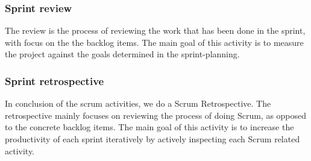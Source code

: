 \subsubsection{Sprint review}
The review is the process of reviewing the work that has been done in the sprint, with focus on the the backlog items. The main goal of this activity is to measure the project against the goals determined in the sprint-planning.
\subsubsection{Sprint retrospective}
In conclusion of the scrum activities, we do a Scrum Retrospective. The retrospective mainly focuses on reviewing the process of doing Scrum, as opposed to the concrete backlog items. The main goal of this activity is to increase the productivity of each sprint iteratively by actively inspecting each Scrum related activity.